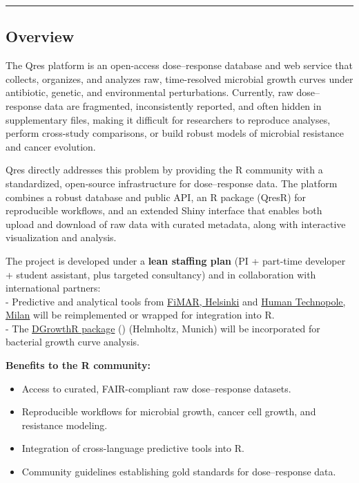 \documentclass[
]{article}
\providecommand{\tightlist}{%
  \setlength{\itemsep}{0pt}\setlength{\parskip}{0pt}}
\begin{document}
\begin{center}\rule{0.5\linewidth}{0.5pt}\end{center}

\subsection{Overview}\label{overview}

The Qres platform is an open-access dose--response database and web
service that collects, organizes, and analyzes raw, time-resolved
microbial growth curves under antibiotic, genetic, and environmental
perturbations. Currently, raw dose--response data are fragmented,
inconsistently reported, and often hidden in supplementary files, making
it difficult for researchers to reproduce analyses, perform cross-study
comparisons, or build robust models of microbial resistance and cancer
evolution.

Qres directly addresses this problem by providing the R community with a
standardized, open-source infrastructure for dose--response data. The
platform combines a robust database and public API, an R package (QresR)
for reproducible workflows, and an extended Shiny interface that enables
both upload and download of raw data with curated metadata, along with
interactive visualization and analysis.

The project is developed under a \textbf{lean staffing plan} (PI +
part-time developer + student assistant, plus targeted consultancy) and
in collaboration with international partners:\\
- Predictive and analytical tools from
\href{https://www.fimar.fi/}{FiMAR, Helsinki} and
\href{https://humantechnopole.it/en/}{Human Technopole, Milan} will be
reimplemented or wrapped for integration into R.\\
- The \href{https://bio-datascience.github.io/DGrowthR/}{DGrowthR
package} () (Helmholtz,
Munich) will be incorporated for bacterial growth curve analysis.

\textbf{Benefits to the R community:}

\begin{itemize}
\tightlist
\item
  Access to curated, FAIR-compliant raw dose--response datasets.
\item
  Reproducible workflows for microbial growth, cancer cell growth, and
  resistance modeling.
\item
  Integration of cross-language predictive tools into R.
\item
  Community guidelines establishing gold standards for dose--response
  data.
\end{itemize}
\end{document}
